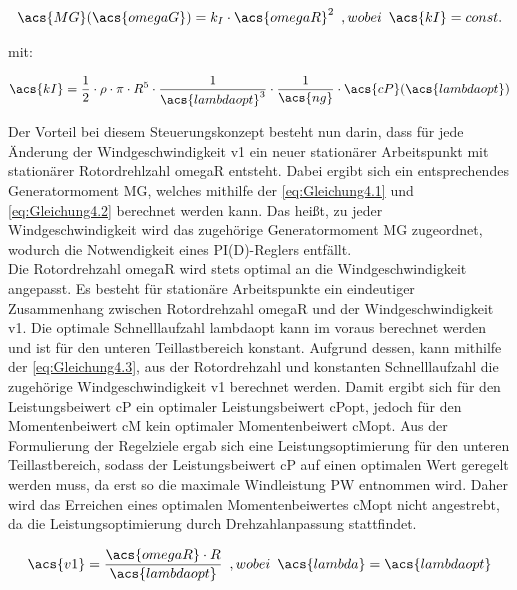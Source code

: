 \begin{align}
    \acs{MG}(\acs{omegaG}) = k_I \cdot \acs{omegaR}^2 \enspace ,wobei \enspace \acs{kI} = const.
    \label{eq:Gleichung4.1}
\end{align}

mit:

\begin{align}
   \acs{kI} = \frac{1}{2} \cdot \rho \cdot \pi \cdot R^5 \cdot \frac{1}{\acs{lambdaopt}^3} \cdot \frac{1}{\acs{ng}} \cdot \acs{cP}(\acs{lambdaopt})
   \label{eq:Gleichung4.2}
\end{align}

Der Vorteil bei diesem Steuerungskonzept besteht nun darin, dass für jede Änderung der Windgeschwindigkeit \acs{v1} ein neuer stationärer Arbeitspunkt mit stationärer Rotordrehlzahl \acs{omegaR} entsteht. Dabei ergibt sich ein entsprechendes Generatormoment \acs{MG}, welches mithilfe der \autoref{eq:Gleichung4.1} und \autoref{eq:Gleichung4.2} berechnet werden kann. Das heißt, zu jeder Windgeschwindigkeit wird das zugehörige Generatormoment \acs{MG} zugeordnet, wodurch die Notwendigkeit eines PI(D)-Reglers entfällt.
\\
Die Rotordrehzahl \acs{omegaR} wird stets optimal an die Windgeschwindigkeit angepasst. Es besteht für stationäre Arbeitspunkte ein eindeutiger Zusammenhang zwischen Rotordrehzahl \acs{omegaR} und der Windgeschwindigkeit \acs{v1}. Die optimale Schnelllaufzahl \acs{lambdaopt} kann im voraus berechnet werden und ist für den unteren Teillastbereich konstant. Aufgrund dessen, kann mithilfe der \autoref{eq:Gleichung4.3}, aus der Rotordrehzahl und konstanten Schnelllaufzahl die zugehörige Windgeschwindigkeit \acs{v1} berechnet werden.  Damit ergibt sich für den Leistungsbeiwert \acs{cP} ein optimaler Leistungsbeiwert \acs{cPopt}, jedoch für den Momentenbeiwert \acs{cM} kein optimaler Momentenbeiwert \acs{cMopt}. Aus der Formulierung der Regelziele ergab sich eine Leistungsoptimierung für den unteren Teillastbereich, sodass der Leistungsbeiwert \acs{cP} auf einen optimalen Wert geregelt werden muss, da erst so die maximale Windleistung \acs{PW} entnommen wird. Daher wird das Erreichen eines optimalen Momentenbeiwertes \acs{cMopt} nicht angestrebt, da die Leistungsoptimierung durch Drehzahlanpassung stattfindet.   

\begin{align}
    \acs{v1} = \frac{\acs{omegaR} \cdot {R}}{\acs{lambdaopt}} \enspace ,wobei \enspace \acs{lambda} = \acs{lambdaopt}
    \label{eq:Gleichung4.3}
\end{align}

